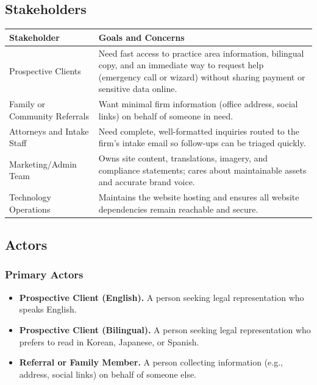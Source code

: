 \documentclass{article}
\begin{document}
\subsection{Stakeholders}

\begin{tabularx}{\textwidth}{@{} p{3.2cm} X @{}}
\toprule
\textbf{Stakeholder} & \textbf{Goals and Concerns} \\
\midrule
Prospective Clients & Need fast access to practice area information, bilingual copy, and an immediate way to request help (emergency call or wizard) without sharing payment or sensitive data online. \\
\midrule %
Family or Community Referrals & Want minimal firm information (office address, social links) on behalf of someone in need. \\
\midrule %
Attorneys and Intake Staff & Need complete, well-formatted inquiries routed to the firm's intake email so follow-ups can be triaged quickly. \\
\midrule %
Marketing/Admin Team & Owns site content, translations, imagery, and compliance statements; cares about maintainable assets and accurate brand voice. \\
\midrule %
Technology Operations & Maintains the website hosting and ensures all website dependencies remain reachable and secure. \\
\bottomrule
\end{tabularx}

\subsection{Actors}

\subsubsection{Primary Actors}
\begin{itemize}
  \item \textbf{Prospective Client (English).} A person seeking legal representation who speaks English.
  \item \textbf{Prospective Client (Bilingual).} A person seeking legal representation who prefers to read in Korean, Japanese, or Spanish.
  \item \textbf{Referral or Family Member.} A person collecting information (e.g., address, social links) on behalf of someone else.
\end{itemize}
\end{document}
